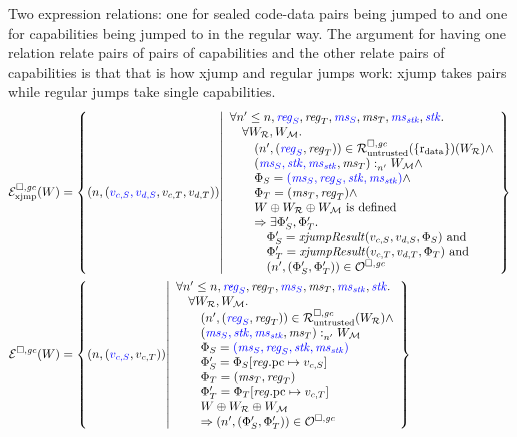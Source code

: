 \documentclass[a4paper]{article}
\begin{document}
Two expression relations: one for sealed code-data pairs being jumped to and one for capabilities being jumped to in the regular way.
The argument for having one relation relate pairs of pairs of capabilities and the other relate pairs of capabilities is that that is how xjump and regular jumps work: xjump takes pairs while regular jumps take single capabilities.
\begin{align*}
  \lrexj(W) &= \left\{ \npair{\stpair[.]{v_{c,S},v_{d,S}}{v_{c,T},v_{d,T}}} \middle| 
    \begin{array}{l}
      \forall n' \leq n, \src{\reg_S}, \reg_T, \src{\ms_S}, \ms_T, \src{\ms_\stk}, \src{\stk} \ldotp\\
      \quad \forall W_\lrrs , W_\lrm \ldotp \\
      \qquad\npair[n']{\stpair{\reg}{\reg}} \in \lrr(\{\rdata\}) (W_\lrrs ) \wedge\\
      \qquad\memSat[n']{\stpair[.]{\ms_S,\stk,\ms_\stk}{\ms_T}}{W_\lrm} \wedge \\
      \qquad\Phi_S = \src{(\ms_S,\reg_S,\stk, \ms_\stk)}\wedge\\
      \qquad\Phi_T = (\ms_T,\reg_T) \wedge\\
      \qquad W \oplus W_\lrrs \oplus W_\lrm \text{ is defined }\\
      \qquad\Rightarrow \exists \Phi_S',\Phi_T'\ldotp\\
      \quad\qquad \Phi_S' = \xjumpResult{v_{c,S}}{v_{d,S}}{\Phi_S} \tand\\
      \quad\qquad\Phi_T' = \xjumpResult{v_{c,T}}{v_{d,T}}{\Phi_T}\tand\\
      \quad\qquad\npair[n']{\left(\Phi_S', \Phi_T' \right)}\in \lro
    \end{array}
    \right\}\\
  \lre(W) &= \left\{ \npair{\stpair[.]{v_{c,S}}{v_{c,T}}} \middle| 
    \begin{array}{l}
      \forall n' \leq n, \src{\reg_S}, \reg_T, \src{\ms_S}, \ms_T, \src{\ms_\stk}, \src{\stk} \ldotp\\
      \quad \forall W_\lrrs , W_\lrm \ldotp \\
      \qquad\npair[n']{\stpair{\reg}{\reg}} \in \lrr(W_\lrrs ) \wedge\\
      \qquad\memSat[n']{\stpair[.]{\ms_S,\stk,\ms_\stk}{\ms_T}}{W_\lrm} \\
      \qquad\Phi_S = \src{(\ms_S,\reg_S,\stk, \ms_\stk)}\\
      \qquad \Phi_S' = \Phi_S \updReg{\pcreg}{v_{c,S}}\\
      \qquad\Phi_T = (\ms_T,\reg_T)\\
      \qquad\Phi_T' = \Phi_T\updReg{\pcreg}{v_{c,T}}\\
      \qquad W \oplus W_\lrrs \oplus W_\lrm\\
      \qquad\Rightarrow\npair[n']{\left(\Phi_S', \Phi_T' \right)}\in \lro
    \end{array}
    \right\}
\end{align*}
\end{document}

